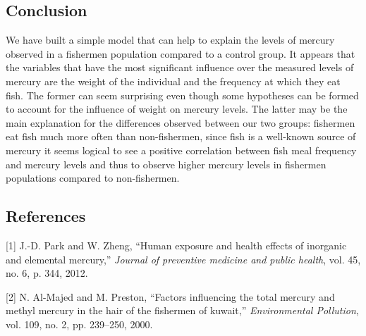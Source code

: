 \documentclass[12pt,]{article}
\begin{document}
\subsection{Conclusion}\label{conclusion}

We have built a simple model that can help to explain the levels of
mercury observed in a fishermen population compared to a control group.
It appears that the variables that have the most significant influence
over the measured levels of mercury are the weight of the individual and
the frequency at which they eat fish. The former can seem surprising
even though some hypotheses can be formed to account for the influence
of weight on mercury levels. The latter may be the main explanation for
the differences observed between our two groups: fishermen eat fish much
more often than non-fishermen, since fish is a well-known source of
mercury it seems logical to see a positive correlation between fish meal
frequency and mercury levels and thus to observe higher mercury levels
in fishermen populations compared to non-fishermen.

\subsection*{References}\label{references}

\hypertarget{refs}{}
\hypertarget{ref-park2012human}{}
{[}1{]} J.-D. Park and W. Zheng, ``Human exposure and health effects of
inorganic and elemental mercury,'' \emph{Journal of preventive medicine
and public health}, vol. 45, no. 6, p. 344, 2012.

\hypertarget{ref-al2000factors}{}
{[}2{]} N. Al-Majed and M. Preston, ``Factors influencing the total
mercury and methyl mercury in the hair of the fishermen of kuwait,''
\emph{Environmental Pollution}, vol. 109, no. 2, pp. 239--250, 2000.
\end{document}
